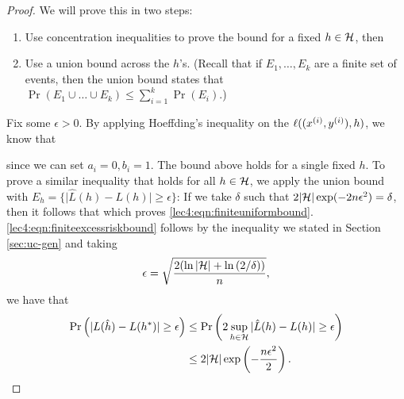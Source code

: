 \begin{proof}
We will prove this in two steps:
\begin{enumerate}
\item Use concentration inequalities to prove the bound for a fixed $h \in \cH$, then
\item Use a union bound across the $h$'s. (Recall that if $E_1, \dots, E_k$ are a finite set of events, then the union bound states that $\Pr ( E_1 \cup \dots \cup E_k) \leq \sum_{i = 1}^k \Pr(E_i)$.)
\end{enumerate}

Fix some $\epsilon > 0$. By applying Hoeffding's inequality on the $\ell( (x\sp{i}, y\sp{i}), h)$, we know that 

since we can set $a_i = 0, b_i = 1$. The bound above holds for a single fixed $h$. To prove a similar inequality that holds for all $h \in \cH$, we apply the union bound with $E_h = \{\vert \hat{L}(h) - L(h) \vert \geq \epsilon \}$:
If we take $\delta$ such that $2\vert \cH \vert \exp(-2n\epsilon^2) = \delta$, then it follows that 
which proves \eqref{lec4:eqn:finiteuniformbound}. \eqref{lec4:eqn:finiteexcessriskbound} follows by the inequality we stated in Section \ref{sec:uc-gen} and taking 
\begin{align}
    \epsilon = \sqrt{\frac{ 2(\ln{\vert \cH \vert} + \ln{(2 / \delta)}) }{n}},
\end{align}
we have that
\begin{align}
\Pr \left( | L(\hat{h}) - L(h^{*}) | \geq \epsilon \right) &\leq \Pr \left( 2 \sup_{h \in \cH} | \hat{L}(h) - L(h) | \geq \epsilon \right) \\
&\leq 2 |\cH| \exp \left( -\frac{n\epsilon^2}{2} \right).
\end{align}
\end{proof}

